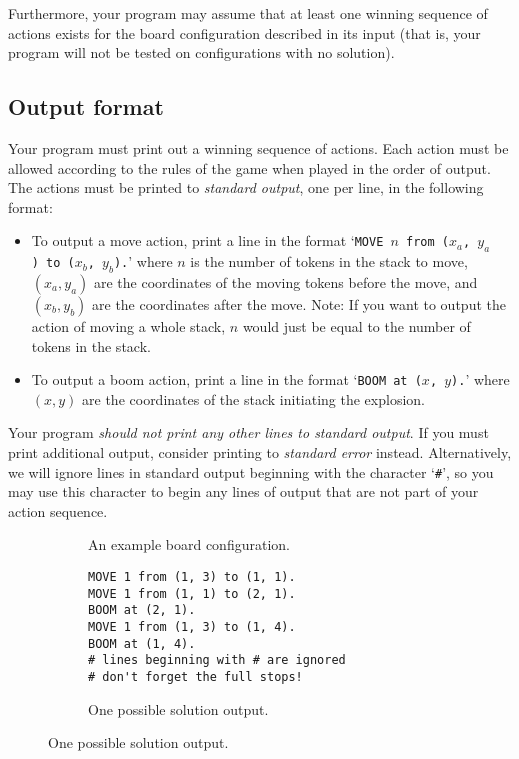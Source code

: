 \documentclass[]{article}
\newcommand{\white}[3] {
  \foreach \x in {0, ..., #3} {
    \draw[fill=white] ({.5+#1},{\x*.1+.5+#2}) circle (0.42) node {#3};
  }
}
\newcommand{\black}[3] {
  \foreach \x in {0, ..., #3} {
    \draw[fill=white!70!black] ({.5+#1},{\x*.1+.5+#2}) circle (0.42) node {#3};
  }
}
\begin{document}
Furthermore, your program may assume that at least one winning sequence
of actions exists for the board configuration described in its input
(that is, your program will not be tested on configurations with no
solution).

\subsection*{Output format}

Your program must print out a winning sequence of actions. Each action
must be allowed according to the rules of the game when played in the
order of output. The actions must be printed to \emph{standard output},
one per line, in the following format:

\begin{itemize}
\item
  To output a move action, print a line in the format
  `\texttt{MOVE\ $n$ from\ ($x_a$,\ $y_a$)\ to\ ($x_b$,\ $y_b$).}'
  where $n$ is the number of tokens in the stack to move, $(x_a, y_a)$
  are the coordinates of the moving tokens before
  the move, and $(x_b, y_b)$ are the coordinates after the move.
  Note: If you want to output the action of moving a whole stack,
  $n$ would just be equal to the number of tokens in the stack.
\item
  To output a boom action, print a line in the format
  `\texttt{BOOM\ at\ ($x$,\ $y$).}'
  where $(x, y)$ are the coordinates of the stack initiating the explosion.
\end{itemize}

Your program \emph{should not print any other lines to standard output}.
If you must print additional output, consider printing to \emph{standard
error} instead. Alternatively, we will ignore lines in standard output
beginning with the character `\texttt{\#}', so you may use this
character to begin any lines of output that are not part of your action
sequence.

\begin{figure}[ht!]
\centering
\begin{subfigure}[b]{.5\textwidth}
\centering
{}
\caption{An example board configuration.}
\end{subfigure}
\begin{subfigure}{.08\textwidth}
\phantom{SP}
\end{subfigure}
\begin{subfigure}[b]{.4\textwidth}
\centering
\begin{verbatim}
MOVE 1 from (1, 3) to (1, 1).
MOVE 1 from (1, 1) to (2, 1).
BOOM at (2, 1).
MOVE 1 from (1, 3) to (1, 4).
BOOM at (1, 4).
# lines beginning with # are ignored
# don't forget the full stops!
\end{verbatim}
\vspace{5ex} %
\caption{One possible solution output.}
\end{subfigure}
\end{figure}
\end{document}
